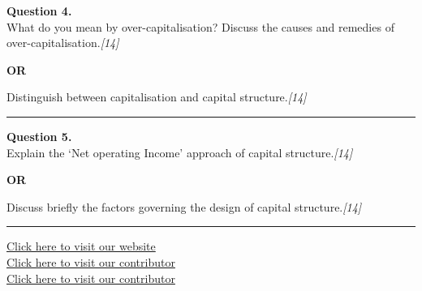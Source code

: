 \documentclass[11pt,a4paper]{article}
\newcommand{\pts}[1]{\hfill   \textit{[#1]}}
\begin{document}
\noindent   \textbf{Question 4.} \\
What do you mean by over-capitalisation? Discuss the causes and remedies of over-capitalisation.\pts{14}

\centerline{   \textbf{OR}}

Distinguish between capitalisation and capital structure.\pts{14}

\medskip\rule{\linewidth}{0.2pt}




\noindent   \textbf{Question 5.} \\
Explain the `Net operating Income' approach of capital structure.\pts{14}

\centerline{   \textbf{OR}}

Discuss briefly the factors governing the design of capital structure.\pts{14}

\vfill
\rule{\linewidth}{0.4pt}

\begin{center}\small
\href{https://bhu-exam.vercel.app/}{Click here to visit our website}\\[4pt]
\href{https://me-aryan.vercel.app/}{Click here to visit our contributor}\\[4pt]
\href{https://quashan-me.vercel.app/}{Click here to visit our contributor}
\end{center}
\end{document}
